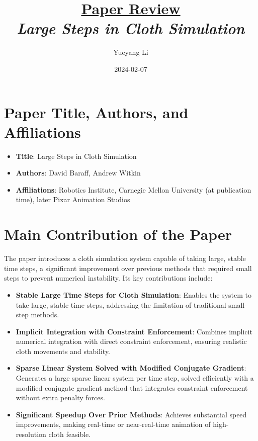 \documentclass[12pt]{article}
\newcommand{\paperTitle}{
    \textit{\normalsize{Large Steps in Cloth Simulation}}
}
\begin{document}
\title{\Large\uline{\textbf{Paper Review}} \\[0.4em]
\paperTitle{} 
}
\author{Yueyang Li}
\date{2024-02-07}

\maketitle

\section{Paper Title, Authors, and Affiliations}
\begin{itemize}[noitemsep]
    \item \textbf{Title}: Large Steps in Cloth Simulation
    \item \textbf{Authors}: David Baraff, Andrew Witkin
    \item \textbf{Affiliations}: Robotics Institute, Carnegie Mellon University (at publication time), later Pixar Animation Studios
\end{itemize}

\section{Main Contribution of the Paper}
The paper introduces a cloth simulation system capable of taking large, stable time steps, a significant improvement over previous methods that required small steps to prevent numerical instability. Its key contributions include:
\begin{itemize}[noitemsep]
    \item \textbf{Stable Large Time Steps for Cloth Simulation}: Enables the system to take large, stable time steps, addressing the limitation of traditional small-step methods.
    \item \textbf{Implicit Integration with Constraint Enforcement}: Combines implicit numerical integration with direct constraint enforcement, ensuring realistic cloth movements and stability.
    \item \textbf{Sparse Linear System Solved with Modified Conjugate Gradient}: Generates a large sparse linear system per time step, solved efficiently with a modified conjugate gradient method that integrates constraint enforcement without extra penalty forces.
    \item \textbf{Significant Speedup Over Prior Methods}: Achieves substantial speed improvements, making real-time or near-real-time animation of high-resolution cloth feasible.
\end{itemize}
\end{document}
